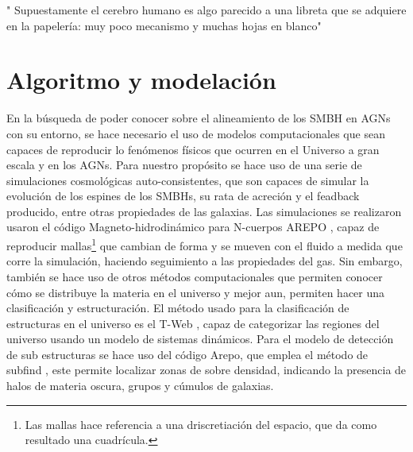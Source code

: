 \begin{savequote}[50mm]
"
Supuestamente el cerebro humano es algo parecido a una libreta que se adquiere en la papelería: muy poco mecanismo y muchas hojas en blanco"
\end{savequote}


\chapter{Algoritmo y modelación}
\label{cha: Algoritmo y modelacion}

En la búsqueda de poder conocer sobre el alineamiento de los SMBH en AGNs con su entorno, se hace necesario el uso de modelos computacionales que sean capaces de reproducir lo fenómenos físicos que ocurren en el Universo a gran escala y en los AGNs. Para nuestro propósito se hace uso de una serie de simulaciones cosmológicas auto-consistentes, que son capaces de simular la evolución de los espines de los SMBHs, su rata de acreción y el feadback producido,  entre otras propiedades de las galaxias. Las simulaciones se realizaron usaron el código Magneto-hidrodinámico para N-cuerpos AREPO \cite{springel2010}, capaz de reproducir mallas\footnote{Las mallas hace referencia a una driscretiación del espacio, que da como resultado una cuadrícula.} que cambian de forma y se mueven con el fluido a medida que corre la simulación,  haciendo seguimiento a las propiedades del gas. Sin embargo, también se hace uso de otros métodos computacionales que permiten conocer cómo se distribuye la materia en el universo y mejor aun, permiten hacer una clasificación y estructuración. El método usado para la clasificación de estructuras en el universo es el  T-Web \cite{hahn2007}, capaz de categorizar las regiones del universo usando un modelo de sistemas dinámicos. Para el modelo de detección de sub estructuras se hace uso del código Arepo, que emplea el método de subfind \cite{springel2018}, este permite localizar zonas de sobre densidad, indicando la presencia de halos de materia oscura, grupos y cúmulos de galaxias. 

